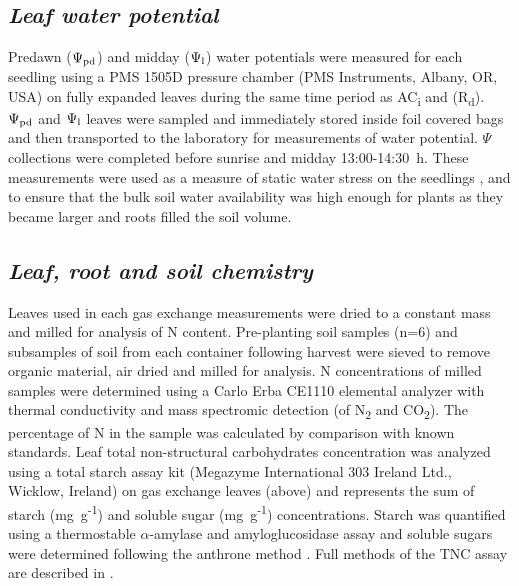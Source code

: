 \documentclass[a4paper]{article}\usepackage[]{graphicx}\usepackage[]{color}
\begin{document}
\subsection*{\textit{Leaf water potential}}
Predawn ($\Psi\textsubscript{pd}$) and midday ($\Psi\textsubscript{l}$) water potentials were measured for each seedling using a PMS 1505D pressure chamber (PMS Instruments, Albany, OR, USA) on fully expanded leaves during the same time period as AC\textsubscript{i} and (R\textsubscript{d}). $\Psi\textsubscript{pd}$ and $\Psi\textsubscript{l}$ leaves were sampled and immediately stored inside foil covered bags and then transported to the laboratory for measurements of water potential. $\Psi$ collections were completed before sunrise and midday 13:00-14:30~h. These measurements were used as a measure of static water stress on the seedlings \citep{sellin1999does}, and to ensure that the bulk soil water availability was high enough for plants as they became larger and roots filled the soil volume. 

\subsection*{\textit{Leaf, root and soil chemistry}}
Leaves used in each gas exchange measurements were dried to a constant mass and milled for analysis of N content. Pre-planting soil samples (n=6) and subsamples of soil from each container following harvest were sieved to remove organic material, air dried and milled for analysis. N concentrations of milled samples were determined using a Carlo Erba CE1110 elemental analyzer with thermal conductivity and mass spectromic detection (of N\textsubscript{2} and CO\textsubscript{2}).  The percentage of N in the sample was calculated by comparison with known standards. Leaf total non-structural carbohydrates concentration was analyzed using a total starch assay kit (Megazyme International 303 Ireland Ltd., Wicklow, Ireland) on gas exchange leaves (above) and represents the sum of starch (mg~g\textsuperscript{-1}) and soluble sugar (mg~g\textsuperscript{-1}) concentrations. Starch was quantified using a thermostable $\alpha$-amylase and amyloglucosidase assay \citep{McCleary_starch} and soluble sugars were determined following the anthrone method \citep{ebell1969variation}. Full methods of the TNC assay are described in \citep{mitchell2013drought}.
\end{document}
